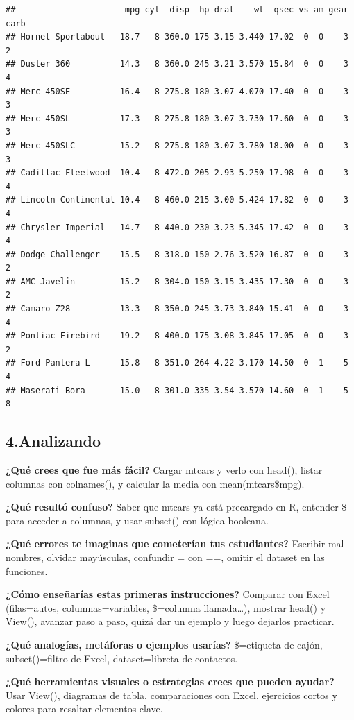 \documentclass[
]{article}
\begin{document}
\begin{verbatim}
##                      mpg cyl  disp  hp drat    wt  qsec vs am gear carb
## Hornet Sportabout   18.7   8 360.0 175 3.15 3.440 17.02  0  0    3    2
## Duster 360          14.3   8 360.0 245 3.21 3.570 15.84  0  0    3    4
## Merc 450SE          16.4   8 275.8 180 3.07 4.070 17.40  0  0    3    3
## Merc 450SL          17.3   8 275.8 180 3.07 3.730 17.60  0  0    3    3
## Merc 450SLC         15.2   8 275.8 180 3.07 3.780 18.00  0  0    3    3
## Cadillac Fleetwood  10.4   8 472.0 205 2.93 5.250 17.98  0  0    3    4
## Lincoln Continental 10.4   8 460.0 215 3.00 5.424 17.82  0  0    3    4
## Chrysler Imperial   14.7   8 440.0 230 3.23 5.345 17.42  0  0    3    4
## Dodge Challenger    15.5   8 318.0 150 2.76 3.520 16.87  0  0    3    2
## AMC Javelin         15.2   8 304.0 150 3.15 3.435 17.30  0  0    3    2
## Camaro Z28          13.3   8 350.0 245 3.73 3.840 15.41  0  0    3    4
## Pontiac Firebird    19.2   8 400.0 175 3.08 3.845 17.05  0  0    3    2
## Ford Pantera L      15.8   8 351.0 264 4.22 3.170 14.50  0  1    5    4
## Maserati Bora       15.0   8 301.0 335 3.54 3.570 14.60  0  1    5    8
\end{verbatim}

\subsection{4.Analizando}\label{analizando}

\textbf{¿Qué crees que fue más fácil?} Cargar mtcars y verlo con head(),
listar columnas con colnames(), y calcular la media con
mean(mtcars\$mpg).

\textbf{¿Qué resultó confuso?} Saber que mtcars ya está precargado en R,
entender \$ para acceder a columnas, y usar subset() con lógica
booleana.

\textbf{¿Qué errores te imaginas que cometerían tus estudiantes?}
Escribir mal nombres, olvidar mayúsculas, confundir = con ==, omitir el
dataset en las funciones.

\textbf{¿Cómo enseñarías estas primeras instrucciones?} Comparar con
Excel (filas=autos, columnas=variables, \$=columna llamada\ldots),
mostrar head() y View(), avanzar paso a paso, quizá dar un ejemplo y
luego dejarlos practicar.

\textbf{¿Qué analogías, metáforas o ejemplos usarías?} \$=etiqueta de
cajón, subset()=filtro de Excel, dataset=libreta de contactos.

\textbf{¿Qué herramientas visuales o estrategias crees que pueden
ayudar?} Usar View(), diagramas de tabla, comparaciones con Excel,
ejercicios cortos y colores para resaltar elementos clave.
\end{document}
